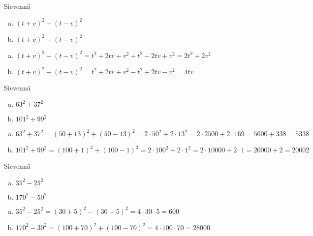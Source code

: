 \begin{tehtava}
    Sievennä
    \begin{enumerate}[a)]
        \item $(t+v)^2+(t-v)^2$
        \item $(t+v)^2-(t-v)^2$
    \end{enumerate}
    \begin{vastaus}
        \begin{enumerate}[a)]
            \item $(t+v)^2+(t-v)^2 = t^2+2tv+v^2+t^2-2tv+v^2 = 2t^2+2v^2$
            \item $(t+v)^2-(t-v)^2 = t^2+2tv+v^2-t^2+2tv-v^2 = 4tv$
        \end{enumerate}
    \end{vastaus}
\end{tehtava}

\begin{tehtava}
    Sievennä
    \begin{enumerate}[a)]
        \item $63^2+37^2$
        \item $101^2+99^2$
    \end{enumerate}
    \begin{vastaus}
        \begin{enumerate}[a)]
            \item $63^2+37^2 = (50+13)^2+(50-13)^2 = 2\cdot 50^2 + 2\cdot 13^2 = 2\cdot 2500 +2\cdot 169 = 5000 + 338 = 5338$
            \item $101^2+99^2 = (100+1)^2+(100-1)^2 = 2\cdot 100^2 + 2\cdot 1^2 = 2\cdot 10000 + 2\cdot 1 = 20000 + 2 = 20002$
        \end{enumerate}
    \end{vastaus}
\end{tehtava}

\begin{tehtava}
    Sievennä
    \begin{enumerate}[a)]
        \item $35^2-25^2$
        \item $170^2-50^2$
    \end{enumerate}
    \begin{vastaus}
        \begin{enumerate}[a)]
            \item $35^2-25^2 = (30+5)^2-(30-5)^2 = 4\cdot 30\cdot 5 = 600$
            \item $170^2-30^2 = (100+70)^2+(100-70)^2 = 4\cdot 100\cdot 70 = 28000$
        \end{enumerate}
    \end{vastaus}
\end{tehtava}
